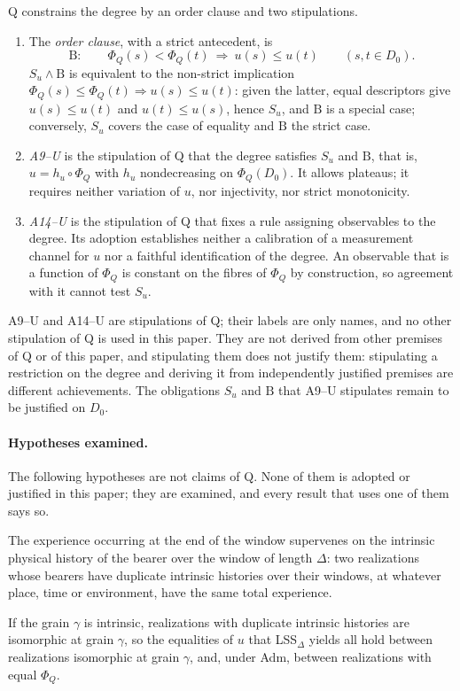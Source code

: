 \begin{definition}\label{def:orderB}
Q constrains the degree by an order clause and two stipulations.
\begin{enumerate}
\item[(a)] The \emph{order clause}, with a strict antecedent, is
\[
\mathrm B:\qquad \Phi_Q(s)<\Phi_Q(t)\ \Longrightarrow\ u(s)\le u(t)\qquad(s,t\in D_0).
\]
$S_u\wedge\mathrm B$ is equivalent to the non-strict implication $\Phi_Q(s)\le\Phi_Q(t)\Rightarrow u(s)\le u(t)$: given the latter, equal descriptors give $u(s)\le u(t)$ and $u(t)\le u(s)$, hence $S_u$, and $\mathrm B$ is a special case; conversely, $S_u$ covers the case of equality and $\mathrm B$ the strict case.
\item[(b)] \emph{A9--U} is the stipulation of Q that the degree satisfies $S_u$ and $\mathrm B$, that is, $u=h_u\circ\Phi_Q$ with $h_u$ nondecreasing on $\Phi_Q(D_0)$. It allows plateaus; it requires neither variation of $u$, nor injectivity, nor strict monotonicity.
\item[(c)] \emph{A14--U} is the stipulation of Q that fixes a rule assigning observables to the degree. Its adoption establishes neither a calibration of a measurement channel for $u$ nor a faithful identification of the degree. An observable that is a function of $\Phi_Q$ is constant on the fibres of $\Phi_Q$ by construction, so agreement with it cannot test $S_u$.
\end{enumerate}
A9--U and A14--U are stipulations of Q; their labels are only names, and no other stipulation of Q is used in this paper. They are not derived from other premises of Q or of this paper, and stipulating them does not justify them: stipulating a restriction on the degree and deriving it from independently justified premises are different achievements. The obligations $S_u$ and $\mathrm B$ that A9--U stipulates remain to be justified on $D_0$.
\end{definition}

\paragraph{Hypotheses examined.} The following hypotheses are not claims of Q. None of them is adopted or justified in this paper; they are examined, and every result that uses one of them says so.

\begin{definition}\label{hyp:LSS}
The experience occurring at the end of the window supervenes on the intrinsic physical history of the bearer over the window of length $\Delta$: two realizations whose bearers have duplicate intrinsic histories over their windows, at whatever place, time or environment, have the same total experience.
\end{definition}
If the grain $\gamma$ is intrinsic, realizations with duplicate intrinsic histories are isomorphic at grain $\gamma$, so the equalities of $u$ that LSS$_\Delta$ yields all hold between realizations isomorphic at grain $\gamma$, and, under Adm, between realizations with equal $\Phi_Q$.

